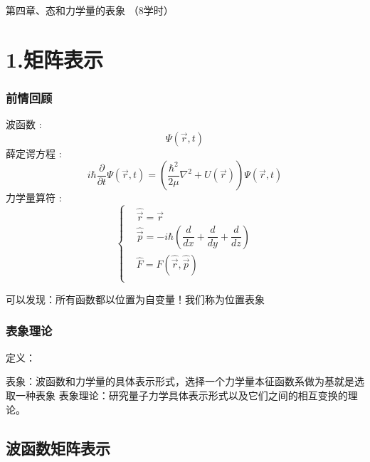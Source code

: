 \begin{frame} [plain]
    \frametitle{}
    \Background[1] 
    \begin{center}
    { {\huge 第四章、态和力学量的表象 （8学时）}}
    \end{center}  
    \addtocounter{framenumber}{-1}   
\end{frame}

\section{1.矩阵表示}

\begin{frame}
    \frametitle{前情回顾}
    \begin{itemize}
        \Item 波函数 : $$ \Psi(\vec{r},t)$$
        \Item 薛定谔方程 :     
        \begin{equation*}
            i\hbar \frac{\partial }{\partial t} \Psi(\vec{r},t) = (\frac{\hbar^2}{2\mu} \nabla^2 +U(\vec{r})) \Psi(\vec{r},t)
        \end{equation*}
        \Item 力学量算符 :
        $$\left\{ \begin{aligned}
            &\hat{\vec{r}} =\vec{r}  \\
            &\hat{\vec{p}} =-i\hbar(\dfrac{d}{d x}+ \dfrac{d}{d y} + \dfrac{d}{d z}) \\
            &\hat{F}=F(\hat{\vec{r}},\hat{\vec{p}}) \\
        \end{aligned} \right.$$
    \end{itemize}   
    可以发现：所有函数都以位置为自变量！我们称为位置表象
\end{frame} 
%
\begin{frame} 
    \frametitle{表象理论}
    \begin{tcolorbox1}{定义：}
        \begin{itemize}
            \Item 表象：波函数和力学量的具体表示形式，选择一个力学量本征函数系做为基就是选取一种表象
            \Item 表象理论：研究量子力学具体表示形式以及它们之间的相互变换的理论。
        \end{itemize}
    \end{tcolorbox1}
\end{frame} 

\subsection{波函数矩阵表示}


